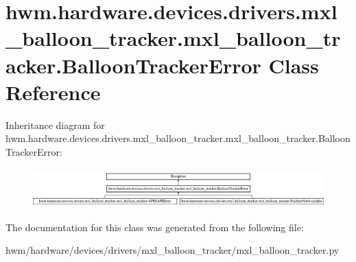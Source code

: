\hypertarget{classhwm_1_1hardware_1_1devices_1_1drivers_1_1mxl__balloon__tracker_1_1mxl__balloon__tracker_1_1_balloon_tracker_error}{\section{hwm.\-hardware.\-devices.\-drivers.\-mxl\-\_\-balloon\-\_\-tracker.\-mxl\-\_\-balloon\-\_\-tracker.\-Balloon\-Tracker\-Error Class Reference}
\label{classhwm_1_1hardware_1_1devices_1_1drivers_1_1mxl__balloon__tracker_1_1mxl__balloon__tracker_1_1_balloon_tracker_error}
}
Inheritance diagram for hwm.\-hardware.\-devices.\-drivers.\-mxl\-\_\-balloon\-\_\-tracker.\-mxl\-\_\-balloon\-\_\-tracker.\-Balloon\-Tracker\-Error\-:\begin{figure}[H]
\begin{center}
\leavevmode
\includegraphics[height=1.530055cm]{classhwm_1_1hardware_1_1devices_1_1drivers_1_1mxl__balloon__tracker_1_1mxl__balloon__tracker_1_1_balloon_tracker_error}
\end{center}
\end{figure}


The documentation for this class was generated from the following file\-:\begin{DoxyCompactItemize}
\item 
hwm/hardware/devices/drivers/mxl\-\_\-balloon\-\_\-tracker/mxl\-\_\-balloon\-\_\-tracker.\-py\end{DoxyCompactItemize}
